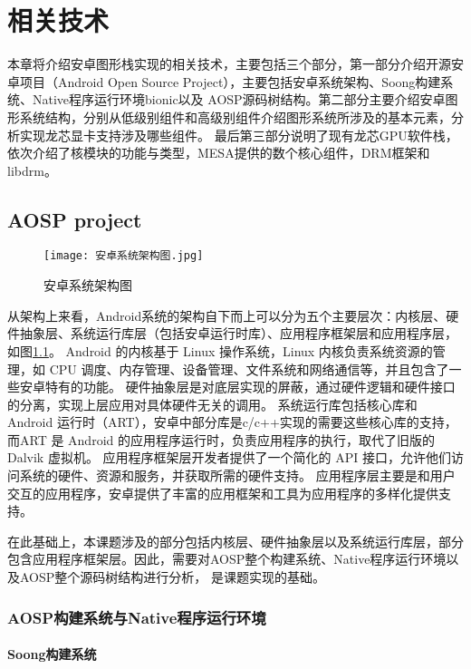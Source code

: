 
\chapter{相关技术}
本章将介绍安卓图形栈实现的相关技术，主要包括三个部分，第一部分介绍开源安卓项目（Android Open Source Project），主要包括安卓系统架构、Soong构建系统、Native程序运行环境bionic以及
AOSP源码树结构。第二部分主要介绍安卓图形系统结构，分别从低级别组件和高级别组件介绍图形系统所涉及的基本元素，分析实现龙芯显卡支持涉及哪些组件。
最后第三部分说明了现有龙芯GPU软件栈，依次介绍了核模块的功能与类型，MESA提供的数个核心组件，DRM框架和libdrm。

\section{AOSP project}

\begin{figure}[h]
  \centering
  \texttt{[image: 安卓系统架构图.jpg]}
  \caption{安卓系统架构图}
  \label{fig:安卓系统架构图}
\end{figure}

从架构上来看，Android系统的架构自下而上可以分为五个主要层次：内核层、硬件抽象层、系统运行库层（包括安卓运行时库）、应用程序框架层和应用程序层，如图\ref{fig:安卓系统架构图}。
Android 的内核基于 Linux 操作系统，Linux 内核负责系统资源的管理，如 CPU 调度、内存管理、设备管理、文件系统和网络通信等，并且包含了一些安卓特有的功能。
硬件抽象层是对底层实现的屏蔽，通过硬件逻辑和硬件接口的分离，实现上层应用对具体硬件无关的调用。
系统运行库包括核心库和 Android 运行时（ART），安卓中部分库是c/c++实现的需要这些核心库的支持，而ART 是 Android 的应用程序运行时，负责应用程序的执行，取代了旧版的 Dalvik 虚拟机。
应用程序框架层开发者提供了一个简化的 API 接口，允许他们访问系统的硬件、资源和服务，并获取所需的硬件支持。
应用程序层主要是和用户交互的应用程序，安卓提供了丰富的应用框架和工具为应用程序的多样化提供支持。

在此基础上，本课题涉及的部分包括内核层、硬件抽象层以及系统运行库层，部分包含应用程序框架层。因此，需要对AOSP整个构建系统、Native程序运行环境以及AOSP整个源码树结构进行分析，
是课题实现的基础。

\subsection{AOSP构建系统与Native程序运行环境}

\subsubsection{Soong构建系统}

